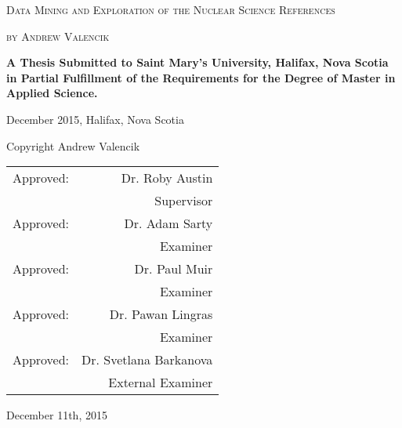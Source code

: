 \begin{titlepage}
    \centering
    {\scshape\LARGE Data Mining and Exploration of the Nuclear Science References\par}
    \vspace{1cm}
    {\scshape\Large by Andrew Valencik\par}
    \vspace{1.5cm}
    {\large\bfseries A Thesis Submitted to Saint Mary’s University, Halifax, Nova Scotia in Partial Fulfillment of the Requirements for the Degree of Master in Applied Science.\par}
    \vspace{1.5cm}
    {\Large December 2015, Halifax, Nova Scotia\par}
    \vfill
    Copyright Andrew Valencik\par
    \vfill

    \renewcommand{\arraystretch}{0.5}
    \raggedleft{}
    \begin{tabular}{l r}
    Approved: & Dr. Roby Austin \\
              & Supervisor      \\[0.2cm]
    Approved: & Dr. Adam Sarty \\
              & Examiner       \\[0.2cm]
    Approved: & Dr. Paul Muir \\
              & Examiner       \\[0.2cm]
    Approved: & Dr. Pawan Lingras \\
              & Examiner       \\[0.2cm]
    Approved: & Dr. Svetlana Barkanova \\
              & External Examiner       \\
    \end{tabular}


    \centering
    \vspace{2cm}
    {\large December 11th, 2015\par}
\end{titlepage}
\thispagestyle{empty} %

